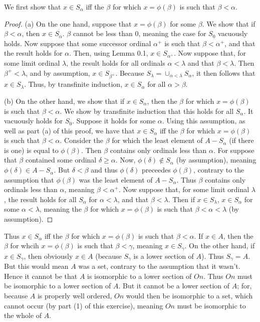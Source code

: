 \documentclass{article}
\theoremstyle{definition}
\begin{document}
We first show that $x\in S_\alpha$ iff the $\beta$ for which $x=\phi(\beta)$ is such that $\beta<\alpha$.
\begin{proof}
(a) On the one hand, suppose that $x=\phi(\beta)$ for some $\beta$. We show that if $\beta<\alpha$, then $x\in S_\alpha$.
$\beta$ cannot be less than $0$, meaning the case for $S_0$ vacuously holds. Now suppose that some successor ordinal $\alpha^+$ is such 
that $\beta<\alpha^+$, and that the result holds for $\alpha$. Then, using Lemma 0.1, $x\in S_{\alpha^+}$. Now suppose that, for some 
limit ordinal $\lambda$, the result holds for all ordinals $\alpha<\lambda$ and that $\beta<\lambda$. 
Then $\beta^+<\lambda$, and by assumption, $x\in S_{\beta^+}$. Because $S_\lambda=\cup_{\alpha<\lambda}S_\alpha$, it then follows that 
$x\in S_\lambda$.
Thus, by transfinite induction, $x\in S_\alpha$ for all 
$\alpha>\beta$. 

(b) On the other hand, we show that if $x\in S_\alpha$, then the $\beta$ for which $x=\phi(\beta)$ is such that $\beta<\alpha$. We show by 
transfinite induction that this holds for all $S_\alpha$. It vacuously holds for $S_0$. Suppose it holds for some $\alpha$. Using this assumption, 
as well as part (a) of this proof, we have that $x\in S_\alpha$ iff the $\beta$ for which $x=\phi(\beta)$ is such that $\beta<\alpha$. Consider the $\beta$ for 
which the least element of $A-S_\alpha$ (if there is one) is equal to $\phi(\beta)$. Then $\beta$ contains only ordinals less than $\alpha$. For suppose that 
$\beta$ contained some ordinal $\delta\ge\alpha$. Now, $\phi(\delta)\notin S_\alpha$ (by assumption), meaning $\phi(\delta)\in A-S_\alpha$. But 
$\delta<\beta$ and thus $\phi(\delta)$ preceedes $\phi(\beta)$, contrary to the assumption that $\phi(\beta)$ was the least element of $A-S_\alpha$. Thus 
$\beta$ contains only ordinals less than $\alpha$, meaning $\beta<\alpha^+$. 
Now suppose that, for some limit ordinal $\lambda$, the result holds for all $S_\alpha$ for $\alpha<\lambda$, and that $\beta<\lambda$. Then if $x\in S_\lambda$, 
$x\in S_\alpha$ for some $\alpha<\lambda$, meaning the $\beta$ for which $x=\phi(\beta)$ is such that $\beta<\alpha<\lambda$ (by assumption).
\end{proof}

Thus $x\in S_\alpha$ iff the $\beta$ for which $x=\phi(\beta)$ is such that $\beta<\alpha$. If $x\in A$, then 
the $\beta$ for whcih $x=\phi(\beta)$ is such that $\beta<\gamma$, meaning $x\in S_\gamma$. On the other hand, 
if $x\in S_\gamma$, then obviously $x\in A$ (because $S_\gamma$ is a lower section of $A$). Thus $S_\gamma=A$. But 
this would mean $A$ was a set, contrary to the assumption that it wasn't. Hence it cannot be that $A$ is isomorphic to a lower section of $On$. Thus 
$On$ must be isomorphic to a lower section of $A$. But it cannot be a lower section of $A$; for, because $A$ is properly well ordered, $On$ would then 
be isomorphic to a set, which cannot occur (by part (1) of this exercise), meaning $On$ must be isomorphic to the whole of $A$. 
\end{document}
